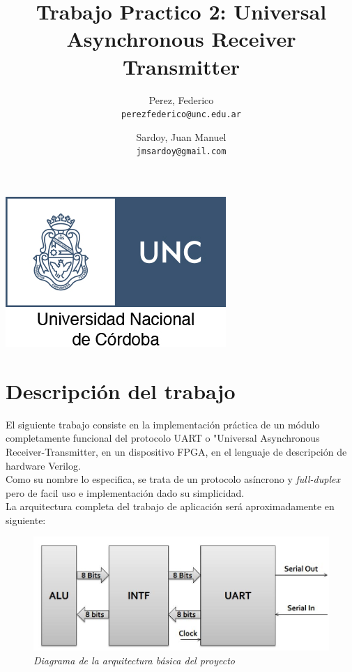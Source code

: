 \documentclass{article}
\title{Trabajo Practico 2: Universal Asynchronous Receiver Transmitter}
\author{Perez, Federico\\
        \texttt{perezfederico@unc.edu.ar}
        \and
        Sardoy, Juan Manuel\\
        \texttt{jmsardoy@gmail.com}
        }
\begin{document}
\maketitle
\begin{center}
    \includegraphics[scale=2]{unc-logo}
\end{center}
\newpage
\section{Descripción del trabajo}

El siguiente trabajo consiste en la implementación práctica de un módulo completamente
funcional del protocolo UART o "Universal Asynchronous Receiver-Transmitter, en un dispositivo FPGA,
en el lenguaje de descripción de hardware Verilog. \\
Como su nombre lo especifica, se trata de un protocolo asíncrono y \textit{full-duplex}
pero de facil uso e implementación dado su simplicidad.\\
La arquitectura completa del trabajo de aplicación será aproximadamente en siguiente:

\begin{figure}[H]
    \includegraphics[scale=0.5]{arch}
    \caption{\textit{Diagrama de la arquitectura básica del proyecto}}
\end{figure}
\end{document}

